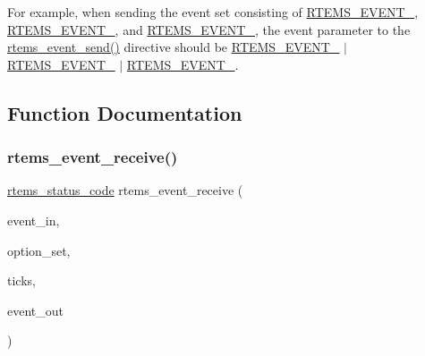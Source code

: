 For example, when sending the event set consisting of \mbox{\hyperlink{group__ClassicEventSet_gaf059cf3f8c08c3953348fb4413652c08}{R\+T\+E\+M\+S\+\_\+\+E\+V\+E\+N\+T\+\_}}, \mbox{\hyperlink{group__ClassicEventSet_ga1908945fa930647fa74ced6f868eaf18}{R\+T\+E\+M\+S\+\_\+\+E\+V\+E\+N\+T\+\_}}, and \mbox{\hyperlink{group__ClassicEventSet_gac9fdddefb1a966354c315634c2390b66}{R\+T\+E\+M\+S\+\_\+\+E\+V\+E\+N\+T\+\_}}, the event parameter to the \mbox{\hyperlink{group__ClassicEvent_ga2d31674c165127bc530178d06d557b94}{rtems\+\_\+event\+\_\+send()}} directive should be \mbox{\hyperlink{group__ClassicEventSet_gaf059cf3f8c08c3953348fb4413652c08}{R\+T\+E\+M\+S\+\_\+\+E\+V\+E\+N\+T\+\_}} $\vert$ \mbox{\hyperlink{group__ClassicEventSet_ga1908945fa930647fa74ced6f868eaf18}{R\+T\+E\+M\+S\+\_\+\+E\+V\+E\+N\+T\+\_}} $\vert$ \mbox{\hyperlink{group__ClassicEventSet_gac9fdddefb1a966354c315634c2390b66}{R\+T\+E\+M\+S\+\_\+\+E\+V\+E\+N\+T\+\_}}. 

\subsection{Function Documentation}
\mbox{\label{group__ClassicEvent_ga87a7b47e1856045e4361f5619ad697cb}} 
\subsubsection{\texorpdfstring{rtems\_event\_receive()}{rtems\_event\_receive()}}
{\footnotesize\ttfamily \mbox{\hyperlink{group__ClassicStatus_ga545d41846817eaba6143d52ee4d9e9fe}{rtems\+\_\+status\+\_\+code}} rtems\+\_\+event\+\_\+receive (\begin{DoxyParamCaption}\item[{\mbox{\hyperlink{group__ClassicEventSet_gab7b8f373bea85fd4e3b7ae23905faa07}{rtems\+\_\+event\+\_\+set}}}]{event\+\_\+in,  }\item[{\mbox{\hyperlink{group__ClassicOptions_gad26685eb0e60a9650082935c31920e29}{rtems\+\_\+option}}}]{option\+\_\+set,  }\item[{\mbox{\hyperlink{group__ClassicTasks_gad39c43f949683d46874e3a5586b93aee}{rtems\+\_\+interval}}}]{ticks,  }\item[{\mbox{\hyperlink{group__ClassicEventSet_gab7b8f373bea85fd4e3b7ae23905faa07}{rtems\+\_\+event\+\_\+set}} $\ast$}]{event\+\_\+out }\end{DoxyParamCaption})}




